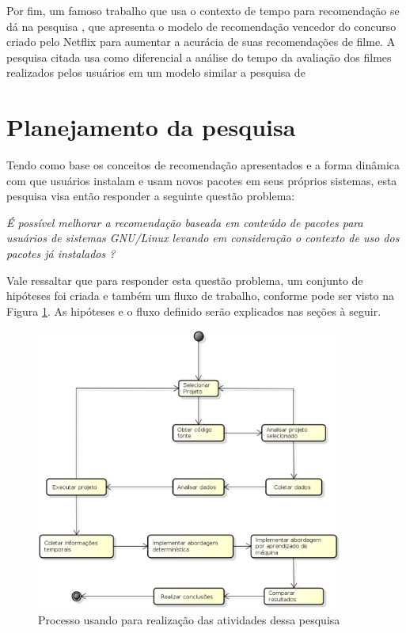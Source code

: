 Por fim, um famoso trabalho que usa o contexto de tempo para recomendação se dá na pesquisa \cite{koren2010collaborative}, que apresenta o modelo de recomendação vencedor
do concurso criado pelo Netflix para aumentar a acurácia de suas recomendações de filme. A pesquisa citada usa como diferencial a análise do tempo da avaliação dos filmes
realizados pelos usuários em um modelo similar a pesquisa de \cite{basile2015modeling}


\section{Planejamento da pesquisa}

Tendo como base os conceitos de recomendação apresentados e a forma dinâmica com
que usuários instalam e usam novos pacotes em seus próprios sistemas, esta
pesquisa visa então responder a seguinte questão problema:

\begin{center}
\textit{É possível melhorar a recomendação baseada em conteúdo de pacotes para
usuários de sistemas GNU/Linux levando em consideração o contexto de uso dos pacotes já instalados ?}
\end{center}

Vale ressaltar que para responder esta questão problema, um conjunto de
hipóteses foi criada e também um fluxo de trabalho, conforme pode ser visto na
Figura \ref{fig:planejamento_pesquisa}. As hipóteses e o fluxo definido serão
explicados nas seções à seguir.

\begin{figure}[h]
  \centering
  \includegraphics[width=0.9\textwidth]{figuras/planejamento_pesquisa.eps}
  \caption{Processo usando para realização das atividades dessa pesquisa}
  \label{fig:planejamento_pesquisa}
\end{figure}


